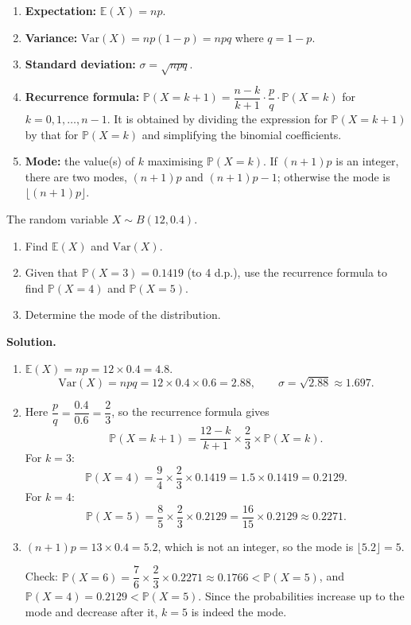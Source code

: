 \documentclass[11pt]{article}
\begin{document}
\begin{methode}
\begin{enumerate}
\item \textbf{Expectation:} $\mathbb{E}(X) = np$.
\item \textbf{Variance:} $\mathrm{Var}(X) = np(1-p) = npq$ where $q = 1-p$.
\item \textbf{Standard deviation:} $\sigma = \sqrt{npq}$.
\item \textbf{Recurrence formula:} $\mathbb{P}(X = k+1) = \dfrac{n-k}{k+1} \cdot \dfrac{p}{q} \cdot \mathbb{P}(X = k)$ for $k = 0,1,\dots,n-1$. It is obtained by dividing the expression for $\mathbb{P}(X=k+1)$ by that for $\mathbb{P}(X=k)$ and simplifying the binomial coefficients.
\item \textbf{Mode:} the value(s) of $k$ maximising $\mathbb{P}(X=k)$. If $(n+1)p$ is an integer, there are two modes, $(n+1)p$ and $(n+1)p-1$; otherwise the mode is $\lfloor (n+1)p \rfloor$.
\end{enumerate}
\end{methode}

\begin{exoresolu}
The random variable $X \sim B(12, 0.4)$.
\begin{enumerate}
\item Find $\mathbb{E}(X)$ and $\mathrm{Var}(X)$.
\item Given that $\mathbb{P}(X = 3) = 0.1419$ (to 4 d.p.), use the recurrence formula to find $\mathbb{P}(X = 4)$ and $\mathbb{P}(X = 5)$.
\item Determine the mode of the distribution.
\end{enumerate}
\tcblower
\textbf{Solution.}
\begin{enumerate}
\item $\mathbb{E}(X) = np = 12 \times 0.4 = 4.8$.
\[
\mathrm{Var}(X) = npq = 12 \times 0.4 \times 0.6 = 2.88, \qquad \sigma = \sqrt{2.88} \approx 1.697.
\]
\item Here $\dfrac{p}{q} = \dfrac{0.4}{0.6} = \dfrac{2}{3}$, so the recurrence formula gives
\[
\mathbb{P}(X = k+1) = \frac{12-k}{k+1} \times \frac{2}{3} \times \mathbb{P}(X = k).
\]
For $k=3$:
\[
\mathbb{P}(X = 4) = \frac{9}{4} \times \frac{2}{3} \times 0.1419 = 1.5 \times 0.1419 = 0.2129.
\]
For $k=4$:
\[
\mathbb{P}(X = 5) = \frac{8}{5} \times \frac{2}{3} \times 0.2129 = \frac{16}{15} \times 0.2129 \approx 0.2271.
\]
\item $(n+1)p = 13 \times 0.4 = 5.2$, which is not an integer, so the mode is $\lfloor 5.2 \rfloor = 5$.

Check: $\mathbb{P}(X=6) = \dfrac{7}{6}\times\dfrac{2}{3}\times 0.2271 \approx 0.1766 < \mathbb{P}(X=5)$, and $\mathbb{P}(X=4) = 0.2129 < \mathbb{P}(X=5)$. Since the probabilities increase up to the mode and decrease after it, $k=5$ is indeed the mode.
\end{enumerate}
\end{exoresolu}
\end{document}
